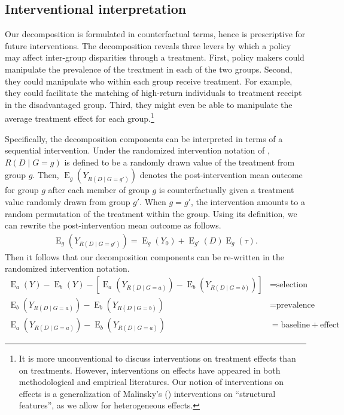 \documentclass[12pt,a4paper]{article}
\newcommand{\E}{\operatorname{E}}
\begin{document}
\subsection{Interventional interpretation}
Our decomposition is formulated in counterfactual terms, hence is prescriptive for future interventions. The decomposition reveals three levers by which a policy may affect inter-group disparities through a treatment. First, policy makers could manipulate the prevalence of the treatment in each of the two groups. Second, they could manipulate who within each group receive treatment. For example, they could facilitate the matching of high-return individuals to treatment receipt in the disadvantaged group. Third, they might even be able to manipulate the average treatment effect for each group.\footnote{It is more unconventional to discuss interventions on treatment effects than on treatments. However, interventions on effects have appeared in both methodological \citep{malinsky_intervening_2018, diderichsen_differential_2019} and empirical \citep{brady_rethinking_2017} literatures.
Our notion of interventions on effects is a generalization of Malinsky's (\citeyear{malinsky_intervening_2018}) interventions on ``structural features'', as we allow for heterogeneous effects.} 

Specifically, the decomposition components can be interpreted in terms of a sequential intervention. Under the randomized intervention notation of \citet{didelez_direct_2006}, $R(D \mid  G=g)$ is defined to be a randomly drawn value of the treatment from group $g$. Then, $\E_g \left(Y_{R(D \mid  G=g') } \right)$ denotes the post-intervention mean outcome for group $g$ after each member of group $g$ is counterfactually given a treatment value randomly drawn from  group $g'$. When $g=g'$, the intervention amounts to a random permutation of the treatment within the group. Using its definition, we can rewrite the post-intervention mean outcome as follows.
\begin{align}
    \E_g \left(Y_{R(D \mid  G=g') } \right) = \E_g (Y_0) + \E_{g'}(D)\E_g(\tau). \label{eqt2}
\end{align}
Then it follows that our decomposition components can be re-written in the randomized intervention notation.
\begin{align*}
   \E_a(Y) - \E_b(Y) - \left[ \E_a \left(Y_{R(D \mid G=a)} \right) - \E_b \left(Y_{R(D \mid G=b)}\right) \right] &= \text{selection} \\
   \E_b \left(Y_{R(D \mid G=a)} \right)-\E_b \left(Y_{R(D \mid G=b)} \right)  &= \text{prevalence} \\
   \E_a \left(Y_{R(D \mid G=a)} \right)-\E_b \left(Y_{R(D \mid G=a)} \right)  &= \text{baseline} + \text{effect} 
\end{align*}
\end{document}
